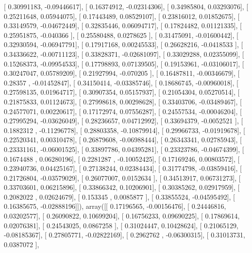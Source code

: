 \documentclass{article}
\begin{document}
       [ 0.30991183, -0.09446617],
       [ 0.16374912, -0.02314306],
       [ 0.34985804,  0.03293076],
       [ 0.25211648,  0.05944075],
       [ 0.17443489,  0.08529107],
       [ 0.23816012,  0.01852675],
       [ 0.33149579, -0.04672449],
       [ 0.32835446,  0.06094717],
       [ 0.17824482,  0.01121335],
       [ 0.25951875, -0.040366  ],
       [ 0.25580488,  0.0278625 ],
       [ 0.31475091, -0.01600442],
       [ 0.32930594, -0.06947791],
       [ 0.17917168,  0.00245533],
       [ 0.26628216, -0.0418533 ],
       [ 0.34336622, -0.00711123],
       [ 0.33828371, -0.02681097],
       [ 0.33029288,  0.02355099],
       [ 0.15268373, -0.09954533],
       [ 0.17798893,  0.07139505],
       [ 0.19153961, -0.03106017],
       [ 0.30247047,  0.05789209],
       [ 0.21927994, -0.070205  ],
       [ 0.16487811, -0.00346679],
       [ 0.28357   , -0.01452847],
       [ 0.34150414, -0.03385746],
       [ 0.18686745, -0.00960018],
       [ 0.27598135,  0.01964717],
       [ 0.30907354,  0.05157937],
       [ 0.21054304,  0.05270514],
       [ 0.21875833,  0.01124673],
       [ 0.27998618,  0.00298628],
       [ 0.33403706, -0.03489467],
       [ 0.24577071,  0.00220617],
       [ 0.17172974,  0.07556287],
       [ 0.24557534, -0.00046204],
       [ 0.27995294, -0.03626049],
       [ 0.28236657,  0.04712992],
       [ 0.33694379, -0.0052521 ],
       [ 0.1882312 , -0.11296778],
       [ 0.28803358, -0.10879914],
       [ 0.29966733, -0.01919678],
       [ 0.22520341,  0.00310478],
       [ 0.26879608, -0.06988444],
       [ 0.26343341,  0.02785943],
       [ 0.23331161, -0.06001525],
       [ 0.33897786,  0.04395281],
       [ 0.23323786, -0.04674399],
       [ 0.1674488 ,  0.06280196],
       [ 0.2281287 , -0.10052425],
       [ 0.17169246,  0.00803572],
       [ 0.23940736,  0.04425167],
       [ 0.27138244,  0.02384434],
       [ 0.31774798, -0.03859416],
       [ 0.21726804, -0.03579029],
       [ 0.26077007,  0.0152634 ],
       [ 0.34513917,  0.06731273],
       [ 0.33703601,  0.06215896],
       [ 0.33866342,  0.10206901],
       [ 0.30385262,  0.02917959],
       [ 0.2082022 ,  0.02624679],
       [ 0.153345  ,  0.0085877 ],
       [ 0.33855524, -0.04595492],
       [ 0.16385675, -0.02888196]]), array([[ 0.17196565, -0.00156476],
       [ 0.24446816,  0.03202577],
       [ 0.26090822,  0.10699204],
       [ 0.16756233,  0.09690225],
       [ 0.17869614,  0.02076381],
       [ 0.24543025,  0.0867258 ],
       [ 0.31024447,  0.10428624],
       [ 0.21065129, -0.08185367],
       [ 0.27805771, -0.02822169],
       [ 0.2962762 , -0.06300315],
       [ 0.31013731,  0.0387072 ],
\end{document}
